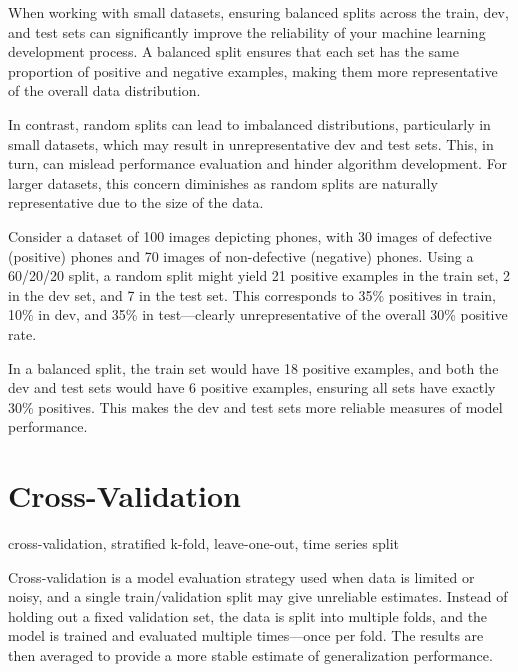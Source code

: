 \documentclass[12pt,openany]{book}
\begin{document}
When working with small datasets, ensuring balanced splits across the train, dev, and test sets can significantly improve the reliability of your machine learning development process. A balanced split ensures that each set has the same proportion of positive and negative examples, making them more representative of the overall data distribution. \newline

In contrast, random splits can lead to imbalanced distributions, particularly in small datasets, which may result in unrepresentative dev and test sets. This, in turn, can mislead performance evaluation and hinder algorithm development. For larger datasets, this concern diminishes as random splits are naturally representative due to the size of the data.

\begin{examplebox}
Consider a dataset of 100 images depicting phones, with 30 images of defective (positive) phones and 70 images of non-defective (negative) phones. Using a 60/20/20 split, a random split might yield 21 positive examples in the train set, 2 in the dev set, and 7 in the test set. This corresponds to 35\% positives in train, 10\% in dev, and 35\% in test—clearly unrepresentative of the overall 30\% positive rate.

In a balanced split, the train set would have 18 positive examples, and both the dev and test sets would have 6 positive examples, ensuring all sets have exactly 30\% positives. This makes the dev and test sets more reliable measures of model performance.
\end{examplebox}




\section{Cross-Validation}

\begin{keywordsbox}
cross-validation, stratified k-fold, leave-one-out, time series split
\end{keywordsbox}

Cross-validation is a model evaluation strategy used when data is limited or noisy, and a single train/validation split may give unreliable estimates. Instead of holding out a fixed validation set, the data is split into multiple folds, and the model is trained and evaluated multiple times—once per fold. The results are then averaged to provide a more stable estimate of generalization performance. 
\newline
\end{document}
